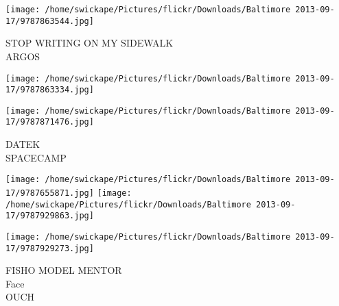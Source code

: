 \documentclass[10pt,letterpaper]{article}
\begin{document}
\vspace{0.25in}
\texttt{[image: /home/swickape/Pictures/flickr/Downloads/Baltimore 2013-09-17/9787863544.jpg]}

STOP WRITING ON MY SIDEWALK\\
ARGOS
\pagebreak

\texttt{[image: /home/swickape/Pictures/flickr/Downloads/Baltimore 2013-09-17/9787863334.jpg]}

\vspace{0.25in}
\texttt{[image: /home/swickape/Pictures/flickr/Downloads/Baltimore 2013-09-17/9787871476.jpg]}

DATEK\\
SPACECAMP
\pagebreak

\texttt{[image: /home/swickape/Pictures/flickr/Downloads/Baltimore 2013-09-17/9787655871.jpg]}
\texttt{[image: /home/swickape/Pictures/flickr/Downloads/Baltimore 2013-09-17/9787929863.jpg]}

\texttt{[image: /home/swickape/Pictures/flickr/Downloads/Baltimore 2013-09-17/9787929273.jpg]}

FISHO MODEL MENTOR\\
Face\\
OUCH
\pagebreak
\end{document}
